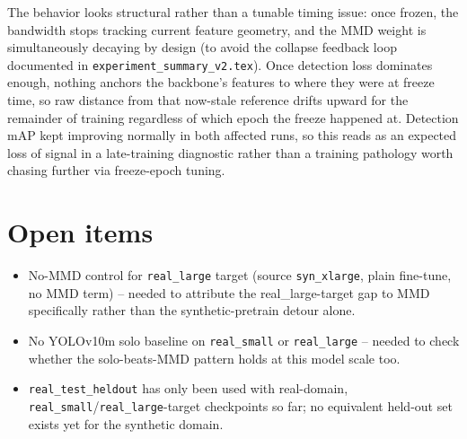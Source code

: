 \documentclass[11pt]{article}
\begin{document}
\noindent The behavior looks structural rather than a tunable timing issue: once
frozen, the bandwidth stops tracking current feature geometry, and the MMD weight is
simultaneously decaying by design (to avoid the collapse feedback loop documented in
\texttt{experiment\_summary\_v2.tex}). Once detection loss dominates enough, nothing
anchors the backbone's features to where they were at freeze time, so raw distance
from that now-stale reference drifts upward for the remainder of training regardless
of which epoch the freeze happened at. Detection mAP kept improving normally in both
affected runs, so this reads as an expected loss of signal in a late-training
diagnostic rather than a training pathology worth chasing further via freeze-epoch
tuning.

\section{Open items}

\begin{itemize}
    \item No-MMD control for \texttt{real\_large} target (source \texttt{syn\_xlarge},
    plain fine-tune, no MMD term) -- needed to attribute the real\_large-target gap
    to MMD specifically rather than the synthetic-pretrain detour alone.
    \item No YOLOv10m solo baseline on \texttt{real\_small} or \texttt{real\_large} --
    needed to check whether the solo-beats-MMD pattern holds at this model scale too.
    \item \texttt{real\_test\_heldout} has only been used with real-domain,
    \texttt{real\_small}/\texttt{real\_large}-target checkpoints so far; no equivalent
    held-out set exists yet for the synthetic domain.
\end{itemize}
\end{document}
